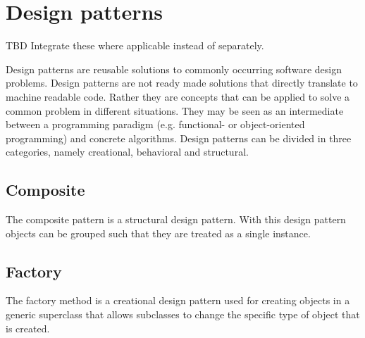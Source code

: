 \section{Design patterns}
TBD Integrate these where applicable instead of separately.

Design patterns are reusable solutions to commonly occurring software design problems. Design patterns are not ready made solutions that directly translate to machine readable code. Rather they are concepts that can be applied to solve a common problem in different situations. They may be seen as an intermediate between a programming paradigm (e.g. functional- or object-oriented programming) and
concrete algorithms. Design patterns can be divided in three categories, namely creational, behavioral and structural.

\subsection{Composite}
The composite pattern is a structural design pattern. With this design pattern objects can be grouped such that they are treated as a
single instance.

\subsection{Factory}
The factory method is a creational design pattern used for creating objects in a generic superclass that allows subclasses to change the
specific type of object that is created.
